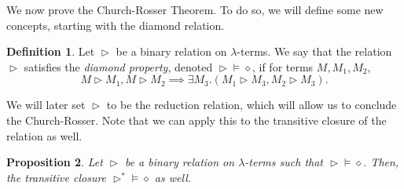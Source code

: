 \documentclass[a4paper, openany]{memoir}
\newtheorem{proposition}{Proposition}[section]
\theoremstyle{definition}
\newtheorem{definition}[proposition]{Definition}
\begin{document}
    We now prove the Church-Rosser Theorem. To do so, we will define some new concepts, starting with the diamond relation.
    \begin{definition}
        Let $\vartriangleright$ be a binary relation on $\lambda$-terms. We say that the relation $\vartriangleright$ satisfies the \emph{diamond property}, denoted $\vartriangleright {\vDash \diamond}$, if for terms $M, M_1, M_2$,
        \[M \vartriangleright M_1, M \vartriangleright M_2 \implies \exists M_3 . (M_1 \vartriangleright M_3, M_2 \vartriangleright M_3).\]
    \end{definition}
    \noindent We will later set $\vartriangleright$ to be the reduction relation, which will allow us to conclude the Church-Rosser. Note that we can apply this to the transitive closure of the relation as well.
    \begin{proposition}
        Let $\vartriangleright$ be a binary relation on $\lambda$-terms such that $\vartriangleright {\vDash \diamond}$. Then, the transitive closure $\vartriangleright^* {\vDash \diamond}$ as well.
    \end{proposition}
\end{document}
